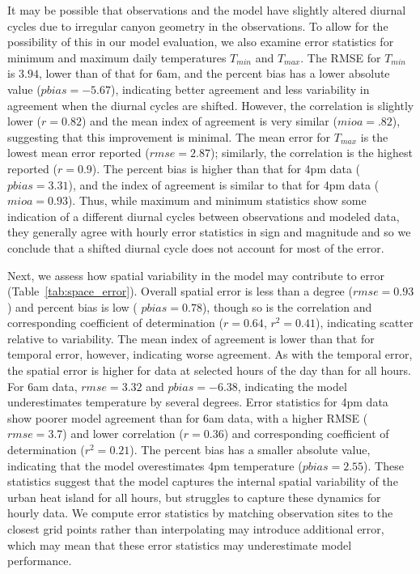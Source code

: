 It may be possible that observations and the model have slightly altered diurnal cycles due to irregular canyon geometry in the observations. To allow for the possibility of this in our model evaluation, we also examine error statistics for minimum and maximum daily temperatures $T_{min}$ and $T_{max}$. The RMSE for $T_{min}$ is $3.94$, lower than of that for 6am, and the percent bias has a lower absolute value ($pbias=-5.67$), indicating better agreement and less variability in agreement when the diurnal cycles are shifted. However, the correlation is slightly lower ($r=0.82$) and the mean index of agreement is very similar ($mioa=.82$), suggesting that this improvement is minimal. The mean error for $T_{max}$ is the lowest mean error reported ($rmse=2.87$); similarly, the correlation is the highest reported ($r=0.9$). The percent bias is higher than that for 4pm data ($pbias=3.31$), and the index of agreement is similar to that for 4pm data ($mioa=0.93$).
Thus, while maximum and minimum statistics show some indication of a different diurnal cycles between observations and modeled data, they generally agree with hourly error statistics in sign and magnitude and so we conclude that a shifted diurnal cycle does not account for most of the error.

Next, we 
assess how spatial variability in the model may contribute to error (Table~\ref{tab:space_error}). Overall spatial error is less than a degree ($rmse=0.93$) and percent bias is low ( $pbias=0.78$), though so is the correlation and corresponding coefficient of determination ($r=0.64$, $r^2=0.41$), indicating scatter relative to variability. 
The mean index of agreement is lower than that for temporal error, however, indicating worse agreement. 
As with the temporal error, the spatial error is higher for data at selected hours of the day than for all hours. For 6am data, $rmse=3.32$ and $pbias=-6.38$, indicating the model underestimates temperature by several degrees. 
Error statistics for 4pm data show poorer model agreement than for 6am data, with a higher RMSE ($rmse = 3.7$) and lower correlation ($r=0.36$) and corresponding coefficient of determination ($r^2 = 0.21$). The percent bias has a smaller absolute value, indicating that the model overestimates 4pm temperature ($pbias=2.55$). 
These statistics suggest that the model captures the internal spatial variability of the urban heat island for all hours, but struggles to capture these dynamics for hourly data. 
We compute error statistics by matching observation sites to the closest grid points rather than interpolating may introduce additional error, which may mean that these error statistics may underestimate model performance.

